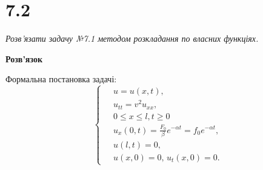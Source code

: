 

%


\section[Задача №7.2]{7.2}

\textit{Розв’язати задачу №7.1 методом розкладання по власних функціях.}

\begin{center}
    \large{\textbf{Розв'язок}}
\end{center}

\noindent Формальна постановка задачі:
\begin{equation} \label{cond7,2}
    \left\{ \begin{aligned} 
            \;&u = u(x,t), \\
            &u_{tt} = v^2 u_{xx}, \\
            &0 \leq x \leq l, t \geq 0 \\
            &u_x(0,t) = \frac{F_0}{\beta} e^{-\alpha t} = f_0 e^{-\alpha t},\\
            &u(l,t) = 0, \\
            &u(x,0) = 0, \, u_t(x,0) = 0.
    \end{aligned} \right.
\end{equation}

